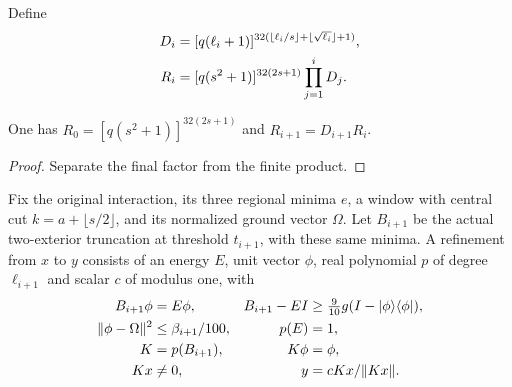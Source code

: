 \begin{definition}
    \label{def:aklv_sequence_rank_product}
    \leanok
    Define
    \begin{align*}
        D_i & =[q(\ell_i+1)]^{32(\lfloor\ell_i/s\rfloor+
        \lfloor\sqrt{\ell_i}\rfloor+1)},\notag           \\
        R_i & =[q(s^2+1)]^{32(2s+1)}\prod_{j=1}^iD_j.
    \end{align*}
\end{definition}

\begin{lemma}
    \label{thm:aklv_sequence_rank_product}
    \leanok
    One has $R_0=[q(s^2+1)]^{32(2s+1)}$ and $R_{i+1}=D_{i+1}R_i$.
\end{lemma}
\begin{proof}
    \leanok
    Separate the final factor from the finite product.
\end{proof}

\begin{definition}
    \label{def:aklv_sequence_step}
    \leanok
    Fix the original interaction, its three regional minima $e$, a window
    with central cut $k=a+\lfloor s/2\rfloor$, and its normalized ground
    vector $\Omega$. Let $B_{i+1}$ be the actual two-exterior truncation
    at threshold $t_{i+1}$, with these same minima.
    A refinement from $x$ to $y$ consists of an energy $E$, unit vector
    $\phi$, real polynomial $p$ of degree $\ell_{i+1}$ and scalar $c$ of
    modulus one, with
    \begin{align*}
        B_{i+1}\phi       & =E\phi,                                            &
        B_{i+1}-EI        & \ge\tfrac9{10}g(I-|\phi\rangle\langle\phi|),\notag                        \\
        \|\phi-\Omega\|^2 & \le\beta_{i+1}/100,                                & p(E)  & =1,\notag    \\
        K                 & =p(B_{i+1}),                                       & K\phi & =\phi,\notag \\
        Kx                & \ne0,                                              & y     & =cKx/\|Kx\|.
    \end{align*}
\end{definition}

